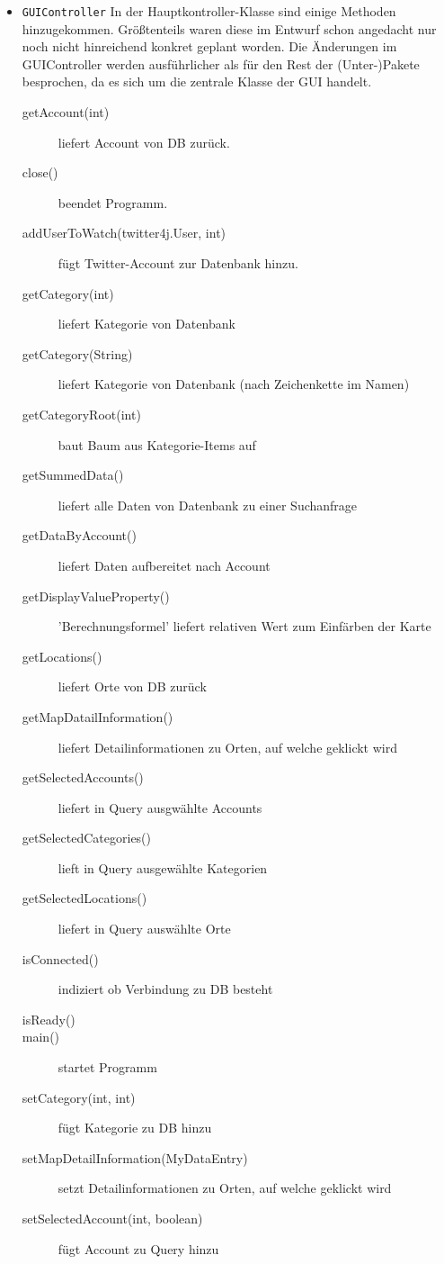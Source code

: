 \begin{itemize}
	\item \lstinline{GUIController}
	\quad 
	In der Hauptkontroller-Klasse sind einige Methoden hinzugekommen. Größtenteils waren diese im Entwurf schon angedacht nur noch nicht hinreichend konkret geplant worden. Die Änderungen im GUIController werden ausführlicher als für den Rest der (Unter-)Pakete besprochen, da es sich um die zentrale Klasse der GUI handelt.
	\begin{description}
		\item[getAccount(int)] liefert Account von DB zurück.
		\item[close()] beendet Programm.
		\item[addUserToWatch(twitter4j.User, int)] fügt Twitter-Account zur Datenbank hinzu.
		\item[getCategory(int)] liefert Kategorie von Datenbank
		\item[getCategory(String)] liefert Kategorie von Datenbank (nach Zeichenkette im Namen)
		\item[getCategoryRoot(int\text{[]})] baut Baum aus Kategorie-Items auf
		\item[getSummedData()] liefert alle Daten von Datenbank zu einer Suchanfrage
		\item[getDataByAccount()] liefert Daten aufbereitet nach Account
		\item[getDisplayValueProperty()] 'Berechnungsformel' liefert relativen Wert zum Einfärben der Karte
		\item[getLocations()] liefert Orte von DB zurück
		\item[getMapDatailInformation()] liefert Detailinformationen zu Orten, auf welche geklickt wird
		\item[getSelectedAccounts()] liefert in Query ausgwählte Accounts
		\item[getSelectedCategories()] lieft in Query ausgewählte Kategorien
		\item[getSelectedLocations()] liefert in Query auswählte Orte
		\item[isConnected()] indiziert ob Verbindung zu DB besteht
		\item[isReady()]
		\item[main()] startet Programm
		\item[setCategory(int, int)] fügt Kategorie zu DB hinzu
		\item[setMapDetailInformation(MyDataEntry)] setzt Detailinformationen zu Orten, auf welche geklickt wird
		\item[setSelectedAccount(int, boolean)] fügt Account zu Query hinzu

\end{description}
\end{itemize}
